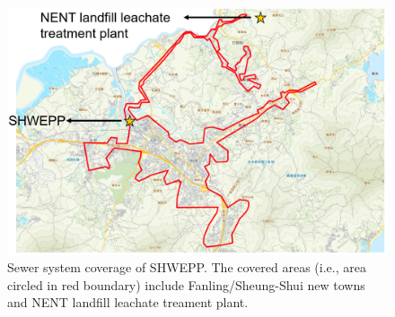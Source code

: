 \begin{figure}[h]
    \centering
    \includegraphics[width=0.95\columnwidth]{imgs/pre-processing/geomap.png}
    \caption{Sewer system coverage of SHWEPP. The covered areas (i.e., area circled in red boundary) include Fanling/Sheung-Shui new towns and NENT landfill leachate treament plant.}
    \label{fig:geomap}
 \end{figure}

